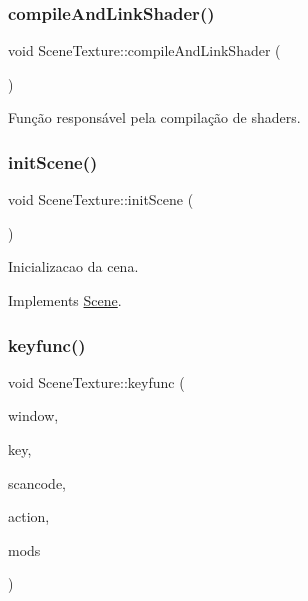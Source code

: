 \mbox{\label{class_scene_texture_ab6fca6f40d60e7e5fd673cd3bbc2bd7b}} 
\subsubsection{\texorpdfstring{compileAndLinkShader()}{compileAndLinkShader()}}
{\footnotesize\ttfamily void Scene\+Texture\+::compile\+And\+Link\+Shader (\begin{DoxyParamCaption}{ }\end{DoxyParamCaption})\hspace{0.3cm}{\ttfamily [private]}}



Função responsável pela compilação de shaders. 

\mbox{\label{class_scene_texture_a22fb3251dd146c10643ca0af54b10bd5}} 
\subsubsection{\texorpdfstring{initScene()}{initScene()}}
{\footnotesize\ttfamily void Scene\+Texture\+::init\+Scene (\begin{DoxyParamCaption}{ }\end{DoxyParamCaption})\hspace{0.3cm}{\ttfamily [virtual]}}



Inicializacao da cena. 



Implements \mbox{\hyperlink{class_scene_ae76b830c1156bb40bd744afb63776be2}{Scene}}.

\mbox{\label{class_scene_texture_a24b162999ad97cbaec810c4257405e97}} 
\subsubsection{\texorpdfstring{keyfunc()}{keyfunc()}}
{\footnotesize\ttfamily void Scene\+Texture\+::keyfunc (\begin{DoxyParamCaption}\item[{G\+L\+F\+Wwindow $\ast$}]{window,  }\item[{int}]{key,  }\item[{int}]{scancode,  }\item[{int}]{action,  }\item[{int}]{mods }\end{DoxyParamCaption})\hspace{0.3cm}{\ttfamily [static]}}



